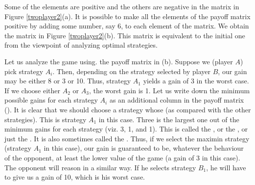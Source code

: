 Some of the elements are positive and the others are negative in the matrix in Figure \ref{twoplayer2}(a). It is possible to make all the elements of the payoff matrix positive by adding some number, say 6, to each element of the
matrix. We obtain the matrix in Figure \ref{twoplayer2}(b). This matrix is equivalent to the initial one from the viewpoint of analyzing optimal strategies.

 Let us analyze the game using. the payoff
matrix in (b). Suppose we (player $A$) pick strategy $A_{i}$. Then, depending on the strategy selected by player $B$, our gain may be either 8 or 3 or 10. Thus, strategy $A_{1}$ yields a gain of 3 in the worst case. If we choose either $A_{2}$ or $A_{3}$, the worst gain is 1. Let us write down the
minimum possible gains for each strategy $A_{i}$ as an additional column in
the payoff matrix (). It is clear that we should choose a strategy whose  (as compared with the other strategies). This is strategy $A_{1}$ in this case. Three is the largest one out of the minimum gains for each strategy (viz. 3, 1, and 1). This is called
the , or the , or just the . It is also sometimes called the . Thus, if we select the maximin strategy (strategy $A_{1}$ in this case), our gain is guaranteed to be, whatever the behaviour of the opponent, at least the lower value of the game (a gain of 3 in this case). The opponent will reason in a similar way. If he selects
strategy $B_{1}$, he will have to give us a gain of 10, which is his worst case.

